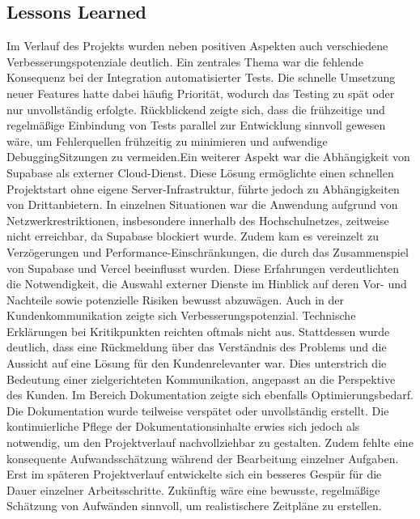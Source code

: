 \documentclass[a4paper,12pt]{article}
\begin{document}

\subsection{Lessons Learned}

Im Verlauf des Projekts wurden neben positiven Aspekten auch verschiedene Verbesserungspotenziale deutlich. Ein zentrales Thema war die fehlende Konsequenz bei der Integration automatisierter Tests. Die schnelle Umsetzung neuer Features hatte dabei häufig Priorität, wodurch das Testing zu spät oder nur unvollständig erfolgte. Rückblickend zeigte sich, dass die frühzeitige und regelmäßige Einbindung von Tests parallel zur Entwicklung sinnvoll gewesen wäre, um Fehlerquellen frühzeitig zu minimieren und aufwendige DebuggingSitzungen zu vermeiden.Ein weiterer Aspekt war die Abhängigkeit von Supabase als externer Cloud-Dienst. Diese Lösung ermöglichte einen schnellen Projektstart ohne eigene Server-Infrastruktur, führte jedoch zu Abhängigkeiten von Drittanbietern. In einzelnen Situationen war die Anwendung aufgrund von Netzwerkrestriktionen, insbesondere innerhalb des Hochschulnetzes, zeitweise nicht erreichbar, da Supabase blockiert wurde. Zudem kam es vereinzelt zu Verzögerungen und Performance-Einschränkungen, die durch das Zusammenspiel von Supabase und Vercel beeinflusst wurden. Diese Erfahrungen verdeutlichten die Notwendigkeit, die Auswahl externer Dienste im Hinblick auf deren Vor- und Nachteile sowie potenzielle Risiken bewusst abzuwägen. Auch in der Kundenkommunikation zeigte sich Verbesserungspotenzial. Technische Erklärungen bei Kritikpunkten reichten oftmals nicht aus. Stattdessen wurde deutlich, dass eine Rückmeldung über das Verständnis des Problems und die Aussicht auf eine Lösung für den Kundenrelevanter war. Dies unterstrich die Bedeutung einer zielgerichteten Kommunikation, angepasst an die Perspektive des Kunden. Im Bereich Dokumentation zeigte sich ebenfalls Optimierungsbedarf. Die Dokumentation wurde teilweise verspätet oder unvollständig erstellt. Die kontinuierliche Pflege der Dokumentationsinhalte erwies sich jedoch als notwendig, um den Projektverlauf nachvollziehbar zu gestalten. Zudem fehlte eine konsequente Aufwandsschätzung während der Bearbeitung einzelner Aufgaben. Erst im späteren Projektverlauf entwickelte sich ein besseres Gespür für die Dauer einzelner Arbeitsschritte. Zukünftig wäre eine bewusste, regelmäßige Schätzung von Aufwänden sinnvoll, um realistischere Zeitpläne zu erstellen.
\end{document}
